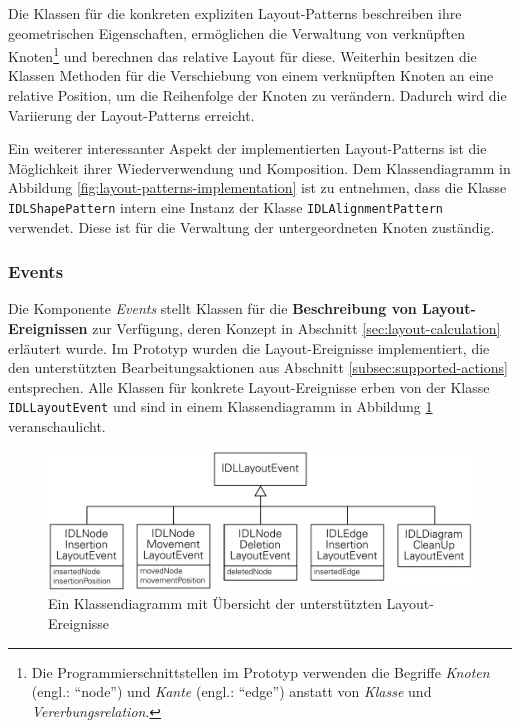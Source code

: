 Die Klassen für die konkreten expliziten Layout-Patterns beschreiben ihre geometrischen Eigenschaften, ermöglichen die Verwaltung von verknüpften Knoten\footnote{Die Programmierschnittstellen im Prototyp verwenden die Begriffe \textit{Knoten} (engl.: \enquote{node}) und \textit{Kante} (engl.: \enquote{edge}) anstatt von \textit{Klasse} und \textit{Vererbungsrelation}.} und berechnen das relative Layout für diese. Weiterhin besitzen die Klassen Methoden für die Verschiebung von einem verknüpften Knoten an eine relative Position, um die Reihenfolge der Knoten zu verändern. Dadurch wird die Variierung der Layout-Patterns erreicht.

Ein weiterer interessanter Aspekt der implementierten Layout-Patterns ist die Möglichkeit ihrer Wiederverwendung und Komposition. Dem Klassendiagramm in Abbildung \ref{fig:layout-patterns-implementation} ist zu entnehmen, dass die Klasse \texttt{IDLShapePattern} intern eine Instanz der Klasse \texttt{IDLAlignmentPattern} verwendet. Diese ist für die Verwaltung der untergeordneten Knoten zuständig.

\subsubsection{Events}
\label{subsubsec:component-events}

Die Komponente \textit{Events} stellt Klassen für die \textbf{Beschreibung von Layout-Ereignissen} zur Verfügung, deren Konzept in Abschnitt \ref{sec:layout-calculation} erläutert wurde. Im Prototyp wurden die Layout-Ereignisse implementiert, die den unterstützten Bearbeitungsaktionen aus Abschnitt \ref{subsec:supported-actions} entsprechen. Alle Klassen für konkrete Layout-Ereignisse erben von der Klasse \texttt{IDLLayoutEvent} und sind in einem Klassendiagramm in Abbildung \ref{fig:layout-events-implementation} veranschaulicht.

\begin{figure}[hbt]
    \centering
    \includegraphics[scale=0.8]{assets/layout-events-implementation}
    \caption{Ein Klassendiagramm mit Übersicht der unterstützten Layout-Ereignisse}
    \label{fig:layout-events-implementation}
\end{figure}

